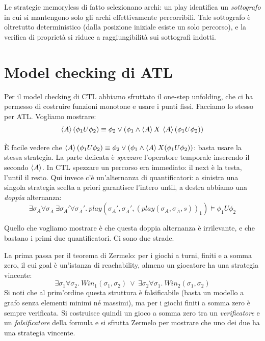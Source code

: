 Le strategie memoryless di fatto selezionano archi: un play identifica un \emph{sottografo} in cui si mantengono solo gli archi effettivamente percorribili. Tale sottografo è oltretutto deterministico (dalla posizione iniziale esiste un solo percorso), e la verifica di proprietà si riduce a raggiungibilità sui sottografi indotti.

\section{Model checking di ATL}

Per il model checking di CTL abbiamo sfruttato il one-step unfolding, che ci ha permesso di costruire funzioni monotone e usare i punti fissi. Facciamo lo stesso per ATL\@. Vogliamo mostrare:
\[\GDia[A] (\phi_1 U\phi_2) \equiv \phi_2 \lor (\phi_1\land \GDia[A] X\, \GDia[A] (\phi_1 U\phi_2))\]

È facile vedere che \(\GDia[A] (\phi_1 U\phi_2) \equiv \phi_2 \lor (\phi_1\land \GDia[A] X (\phi_1 U\phi_2))\): basta usare la stessa strategia. La parte delicata è \emph{spezzare} l'operatore temporale inserendo il secondo \(\GDia[A]\). In CTL spezzare un percorso era immediato: il next è la testa, l'until il resto. Qui invece c'è un'alternanza di quantificatori: a sinistra una singola strategia scelta a priori garantisce l'intero until, a destra abbiamo una \emph{doppia} alternanza:
\[\exists \sigma_A \forall \sigma_{\overline{A}}\ \exists \sigma_{A}' \forall \sigma_{\overline{A}}'.\ play\left(\sigma_{A}',\sigma_{\overline{A}}',{\left(play(\sigma_A,\sigma_{\overline{A}},s)\right)}_1\right) \models \phi_1 U \phi_2\]

Quello che vogliamo mostrare è che questa doppia alternanza è irrilevante, e che bastano i primi due quantificatori. Ci sono due strade.

La prima passa per il teorema di Zermelo: per i giochi a turni, finiti e a somma zero, il cui goal è un'istanza di reachability, almeno un giocatore ha una strategia vincente:
\[\exists \sigma_1 \forall \sigma_2.\ Win_1(\sigma_1,\sigma_2)\ \lor\ \exists \sigma_2 \forall \sigma_1.\ Win_2(\sigma_1,\sigma_2) \]
Si noti che al prim'ordine questa struttura è falsificabile (basta un modello a grafo senza elementi minimi né massimi), ma per i giochi finiti a somma zero è sempre verificata. Si costruisce quindi un gioco a somma zero tra un \emph{verificatore} e un \emph{falsificatore} della formula e si sfrutta Zermelo per mostrare che uno dei due ha una strategia vincente.

